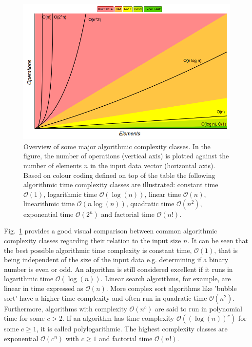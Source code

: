 \begin{figure}[H]
      \centering
       \includegraphics[scale=0.43]{img/bigocomplexity.png}
       \caption[]{\label{fig:algcomplexities} Overview of some major algorithmic complexity classes. In the figure, the number of operations (vertical axis) is plotted against the number of elements $n$ in the input data vector (horizontal axis). Based on colour coding defined on top of the table the following algorithmic time complexity classes are illustrated: constant time $\mathcal{O}(1)$, logarithmic time $\mathcal{O}(\log(n))$, linear time $\mathcal{O}(n)$, linearithmic time $\mathcal{O}(n\mathrm{ }\log(n))$, quadratic time $\mathcal{O}(n^2)$, exponential time $\mathcal{O}(2^n)$ and factorial time $\mathcal{O}(n!)$.\footnotemark[6]}
\end{figure}

Fig.~\ref{fig:algcomplexities} provides a good visual comparison between common algorithmic complexity classes regarding their relation to the input size $n$. It can be seen that the best possible algorithmic time complexity is constant time, $\mathcal{O}(1)$, that is being independent of the size of the input data e.g. determining if a binary number is even or odd. An algorithm is still considered excellent if it runs in logarithmic time $\mathcal{O}(\log(n))$. Linear search algorithms, for example, are linear in time expressed as $\mathcal{O}(n)$. More complex sort algorithms like 'bubble sort' have a higher time complexity and often run in quadratic time $\mathcal{O}(n^2)$. Furthermore, algorithms with complexity $\mathcal{O}(n^c)$ are said to run in polynomial time for some $c > 2$. If an algorithm has time complexity $\mathcal{O}((\log(n))^c)$ for some $c \geq 1$, it is called polylogarithmic. The highest complexity classes are exponential $\mathcal{O}(c^n)$ with $c \geq 1$ and factorial time $\mathcal{O}(n!)$. 

